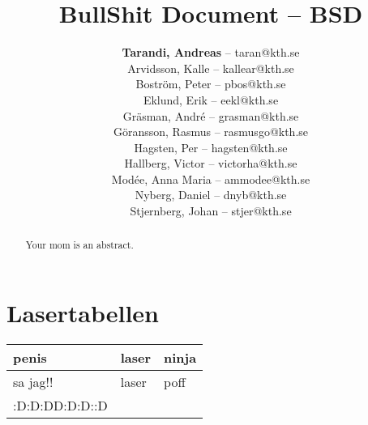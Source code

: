 \documentclass[a4paper, twoside, 11pt, titlepage]{article}
\author{
	\small
	\textbf{Tarandi, Andreas} -- taran@kth.se \\
	Arvidsson, Kalle -- kallear@kth.se\\
	Boström, Peter -- pbos@kth.se\\
	Eklund, Erik -- eekl@kth.se\\
	Gräsman, André -- grasman@kth.se\\
	Göransson, Rasmus -- rasmusgo@kth.se\\
	Hagsten, Per -- hagsten@kth.se\\
	Hallberg, Victor -- victorha@kth.se\\
	Modée, Anna Maria -- ammodee@kth.se\\
	Nyberg, Daniel -- dnyb@kth.se\\
	Stjernberg, Johan -- stjer@kth.se
	}
\title{BullShit Document -- BSD}
\begin{document}
\maketitle

\begin{abstract}
	Your mom is an abstract.
\end{abstract}

\newpage

\tableofcontents

\clearpage
\setcounter{page}{1}

\startfooter

\section{Lasertabellen}

\begin{tabular} { | l | l | l | }
	\hline
	penis & laser & ninja  \\
\hline
	sa jag!! & laser & poff  \\
\hline
	:D:D:DD:D:D::D &  &   \\
\hline
\end{tabular}
\end{document}
